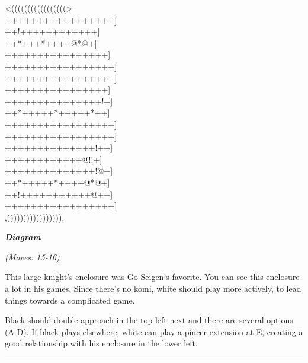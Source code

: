 \documentclass[letterpaper,12pt]{memoir}
\newcounter{GoFigure}[part]
\newcommand{\gofigure}{%
 \stepcounter{GoFigure}
 \centerline{\textit{\textbf{Diagram \arabic{GoFigure}}}}
}
\newcommand{\subtext}[1]{\centerline{\textit{#1}}}
\begin{document}
\begin{minipage}[t]{240pt}
\label{Fujisawa-Hosai-vs-Go-Seigen-19430225:0:mainmove-15}
{\gnos
<(((((((((((((((((>\\
+++++++++++++++++]\\
++!++++++++++++]\\
++*+++*++++@*@+]\\
++++++++++++++++]\\
+++++++++++++++++]\\
+++++++++++++++++]\\
++++++++++++++++]\\
+++++++++++++++!+]\\
++*+++++*+++++*++]\\
+++++++++++++++++]\\
+++++++++++++++++]\\
++++++++++++++!++]\\
++++++++++++@!!+]\\
++++++++++++++!@+]\\
++*+++++*++++@*@+]\\
++!+++++++++++@++]\\
+++++++++++++++++]\\
,))))))))))))))))).\\
}
\gofigure
\subtext{(Moves: 15-16)}
\end{minipage}
\begin{minipage}[t]{115.19999999999999pt}
\setlength{\parskip}{0.5em}
This large knight's enclosure was Go Seigen's favorite. You can see this enclosure a lot in his games. Since there's no komi, white should play more actively, to lead things towards a complicated game.

Black should double approach in the top left next and there are several options (A-D). If black plays elsewhere, white can play a pincer extension at E, creating a good relationship with his enclosure in the lower left.


\end{minipage}
\vfill

\rule{\textwidth}{0.5pt}
\end{document}
